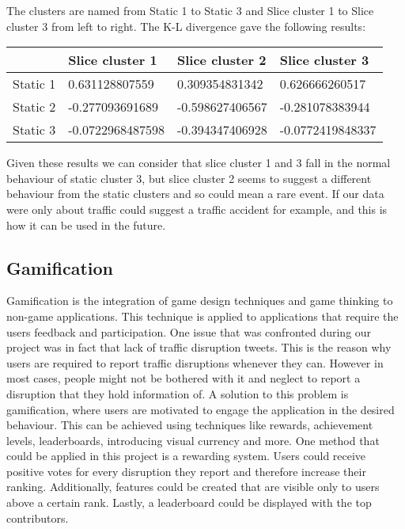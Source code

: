 The clusters are named from Static 1 to Static 3 and Slice cluster 1 to Slice
cluster 3 from left to right. The K-L divergence gave the following results:

\begin{center}
    \begin{tabular}{| l | l | l | l |}
    \hline
    & Slice cluster 1 & Slice cluster 2 & Slice cluster 3 \\ \hline
    Static 1 & 0.631128807559 & 0.309354831342 & 0.626666260517 \\ \hline
    Static 2 & -0.277093691689 & -0.598627406567 & -0.281078383944 \\ \hline
    Static 3 & -0.0722968487598 & -0.394347406928 & -0.0772419848337 \\ \hline
    \end{tabular}
\end{center}

Given these results we can consider that slice cluster 1 and 3 fall in the
normal behaviour of static cluster 3, but slice cluster 2 seems to suggest a
different behaviour from the static clusters and so could mean a rare event.
If our data were only about traffic could suggest a traffic accident for
example, and this is how it can be used in the future.

\subsection{Gamification}
Gamification is the integration of game design techniques and game thinking to non-game applications.
This technique is applied to applications that require the users feedback and participation. One issue that was confronted during our project
was in fact that lack of traffic disruption tweets. This is the reason why users are 
required to report traffic disruptions whenever they can. However in most cases, people might not be bothered with it and 
neglect to report a disruption that they hold information of. A solution to this problem is gamification, where users are motivated to engage the application in the desired behaviour. This can be achieved using techniques like rewards, achievement levels, leaderboards, introducing visual currency and more. One method that could be 
applied in this project is a rewarding system. Users could receive positive votes for every disruption they report and therefore increase their ranking. 
Additionally, features could be created that are visible only to users above a certain rank. Lastly, a leaderboard could be displayed with the top contributors.


